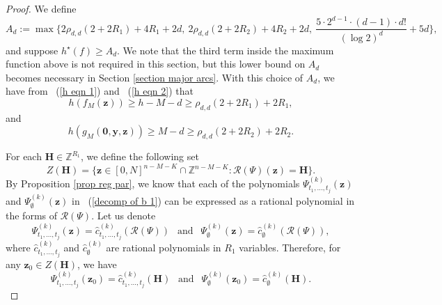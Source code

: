 \documentclass[12pt]{amsart}
\theoremstyle{definition}
\theoremstyle{remark}
\numberwithin{equation}{section}
\begin{document}
\begin{proof}
We define
\begin{equation}
\label{def of Ad}
A_d :=  \max\{ 2 \rho_{d,d}( 2 + 2 R_1) + 4 R_1 + 2d , \ 2 \rho_{d,d}( 2 + 2 R_2) + 4 R_2 + 2d , \ \frac{5 \cdot 2^{d-1} \cdot (d-1) \cdot d!}{(\log 2)^d} + 5d\},
\end{equation}
and suppose $h^{\star}(f) \geq A_d$. We note that the third term inside the maximum function above is not required in this section, but
this lower bound on $A_d$ becomes necessary in Section \ref{section major arcs}.
With this choice of $A_d$, we have from ~(\ref{h eqn 1}) and ~(\ref{h eqn 2}) that
\begin{equation}
\label{cond on h and M}
h( f_M( \mathbf{z} ) ) \geq h - M - d \geq \rho_{d,d}( 2 + 2 R_1) + 2 R_1,
\end{equation}
and
\begin{equation}
\label{cond on h and M'}
h( g_M(\mathbf{0}, \mathbf{y}, \mathbf{z} ) ) \geq M - d \geq  \rho_{d,d}( 2 + 2 R_2) + 2 R_2.
\end{equation}

For each $\mathbf{H} \in \mathbb{Z}^{R_1}$, we define the following set
$$
Z(\mathbf{H}) = \{ \mathbf{z} \in [0, N]^{n-M-K} \cap \mathbb{Z}^{n -M -K} : \mathcal{R}(\Psi) (\mathbf{z}) = \mathbf{H} \}.
$$
By Proposition \ref{prop reg par}, we know that each of the polynomials $\Psi^{(k)}_{t_1, ..., t_{j}} (\mathbf{z})$ and ${\Psi}^{(k)}_{\emptyset}(\mathbf{z})$ in ~(\ref{decomp of b 1}) can be expressed as a rational polynomial in the forms of $\mathcal{R}(\Psi)$. Let us denote
$$
\Psi^{(k)}_{t_1, ..., t_{j}} (\mathbf{z}) = {\hat{c} }^{(k)}_{ t_1, ..., t_{j}} ( \mathcal{R}(\Psi) ) \ \  \mbox{  and  } \  \
{\Psi}^{(k)}_{\emptyset} (\mathbf{z}) =  {\hat{c}}^{(k)}_{\emptyset} ( \mathcal{R}(\Psi) ),
$$
where ${\hat{c} }^{(k)}_{ t_1, ..., t_{j}} $ and  ${\hat{c}}^{(k)}_{\emptyset}$ are rational polynomials in $R_1$ variables.
Therefore, for any $\mathbf{z}_0 \in Z(\mathbf{H})$, we have
$$
\Psi^{(k)}_{t_1, ..., t_{j}}(\mathbf{z}_0) = {\hat{c} }^{(k)}_{ t_1, ..., t_{j}} ( \mathbf{H} ) \ \  \mbox{  and  } \  \
{\Psi}^{(k)}_{\emptyset}(\mathbf{z}_0) =  {\hat{c}}^{(k)}_{\emptyset} ( \mathbf{H} ).
$$


\end{proof}
\end{document}
